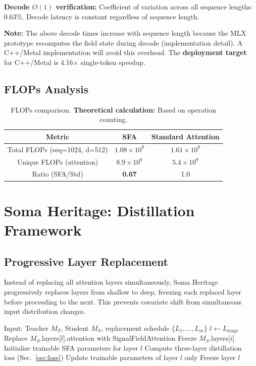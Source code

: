 \documentclass[11pt]{article}
\begin{document}
\textbf{Decode $O(1)$ verification:} Coefficient of variation across all sequence lengths: 0.63\%. Decode latency is constant regardless of sequence length.

\textbf{Note:} The above decode times increase with sequence length because the MLX prototype recomputes the field state during decode (implementation detail). A C++/Metal implementation will avoid this overhead. The \textbf{deployment target} for C++/Metal is 4.16$\times$ single-token speedup.

\subsection{FLOPs Analysis}

\begin{table}[h]
\centering
\begin{tabular}{ccc}
\toprule
Metric & SFA & Standard Attention \\
\midrule
Total FLOPs (seq=1024, d=512) & $1.08 \times 10^9$ & $1.61 \times 10^9$ \\
Unique FLOPs (attention) & $8.9 \times 10^6$ & $5.4 \times 10^8$ \\
Ratio (SFA/Std) & \textbf{0.67} & 1.0 \\
\bottomrule
\end{tabular}
\caption{FLOPs comparison. \textbf{Theoretical calculation:} Based on operation counting.}
\end{table}

\section{Soma Heritage: Distillation Framework}

\subsection{Progressive Layer Replacement}

Instead of replacing all attention layers simultaneously, Soma Heritage progressively replaces layers from shallow to deep, freezing each replaced layer before proceeding to the next. This prevents covariate shift from simultaneous input distribution changes.

\begin{algorithm}[h]
\caption{Progressive Distillation}
\begin{algorithmic}[1]
\State Input: Teacher $M_T$, Student $M_S$, replacement schedule $\{L_1, \dots, L_m\}$
    \State $l \gets L_{\text{stage}}$
    \State Replace $M_S$.layers[$l$].attention with SignalFieldAttention
        \State Freeze $M_S$.layers[$i$]
    \EndFor
    \State Initialize trainable SFA parameters for layer $l$
        \State Compute three-layer distillation loss (Sec.~\ref{sec:loss})
        \State Update trainable parameters of layer $l$ only
    \EndFor
    \State Freeze layer $l$
\EndFor
\end{algorithmic}
\end{algorithm}
\end{document}
